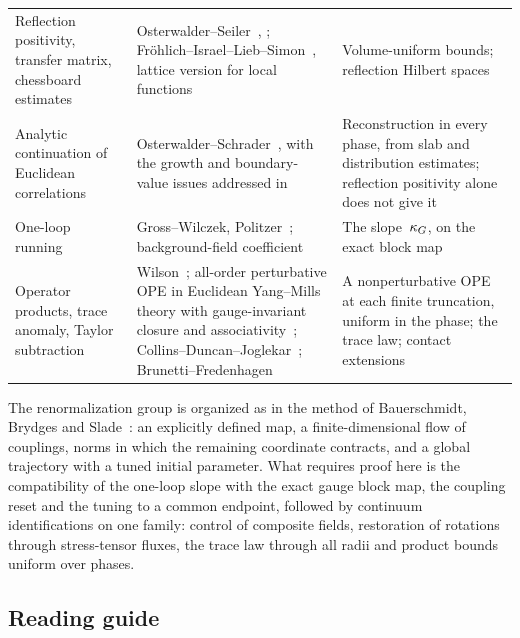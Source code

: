 \begin{longtable}{@{}p{}p{}p{}@{}}
Reflection positivity, transfer matrix, chessboard estimates & Osterwalder--Seiler~\cite{OsterwalderSeiler1978}, \cite[\S2a, Theorem~2.1]{Seiler1982}; Fr\"ohlich--Israel--Lieb--Simon~\cite[\S4, Theorems~4.1--4.2]{FrohlichIsraelLiebSimon1978}, lattice version for local functions~\cite[Theorem~2.2]{Seiler1982} & Volume-uniform bounds; reflection Hilbert spaces\\[2pt]
Analytic continuation of Euclidean correlations & Osterwalder--Schrader~\cite{OsterwalderSchrader1973}, with the growth and boundary-value issues addressed in~\cite{OsterwalderSchrader1975} & Reconstruction in every phase, from slab and distribution estimates; reflection positivity alone does not give it\\[2pt]
One-loop running & Gross--Wilczek, Politzer~\cite{GrossWilczek1973,Politzer1973}; background-field coefficient~\cite[\S3.3]{Abbott1982} & The slope~$\kappa_G$, on the exact block map\\[2pt]
Operator products, trace anomaly, Taylor subtraction & Wilson~\cite[\S II]{Wilson1969}; all-order perturbative OPE in Euclidean Yang--Mills theory with gauge-invariant closure and associativity~\cite{FrobHolland2016}; Collins--Duncan--Joglekar~\cite[(3.19)--(3.21)]{CollinsDuncanJoglekar1977}; Brunetti--Fredenhagen~\cite[\S5.2]{BrunettiFredenhagen2000} & A nonperturbative OPE at each finite truncation, uniform in the phase; the trace law; contact extensions\\
\end{longtable}
\endgroup

The renormalization group is organized as in the method of Bauerschmidt, Brydges and Slade~\cite{BauerschmidtBrydgesSlade2019}: an explicitly defined map, a finite-dimensional flow of couplings, norms in which the remaining coordinate contracts, and a global trajectory with a tuned initial parameter. What requires proof here is the compatibility of the one-loop slope with the exact gauge block map, the coupling reset and the tuning to a common endpoint, followed by continuum identifications on one family: control of composite fields, restoration of rotations through stress-tensor fluxes, the trace law through all radii and product bounds uniform over phases.

\subsection{Reading guide}\label{sec:reading-guide}

